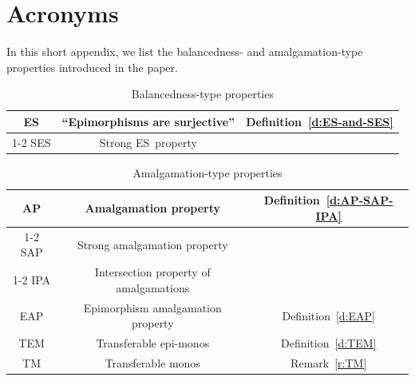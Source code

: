 \documentclass[a4paper,10pt,reqno]{amsart}
\theoremstyle{definition}
\theoremstyle{remark}
\newcommand{\ES}{\textnormal{ES}}
\newcommand{\SES}{\textnormal{SES}}
\newcommand{\AP}{\textnormal{AP}}
\newcommand{\IPA}{\textnormal{IPA}}
\newcommand{\TM}{\textnormal{TM}}
\newcommand{\SAP}{\textnormal{SAP}}
\newcommand{\EAP}{\textnormal{EAP}}
\newcommand{\TEM}{\textnormal{TEM}}
\begin{document}
\appendix
\section{Acronyms}\label{s:acronyms}

In this short appendix, we list the balancedness- and amalgamation-type properties introduced in the paper. 

\begin{table}[H]
\centering
\begin{tabular}{ |c|c|c| } 
 \hline
 \ES & ``Epimorphisms are surjective'' & \multirow{2}{*}{Definition~\ref{d:ES-and-SES}} \\ 
 \cline{1-2}
 \SES & Strong \ES~property &  \\ 
 \hline
\end{tabular}
\caption{Balancedness-type properties}
\end{table}

\begin{table}[H]
\centering
\begin{tabular}{ |c|c|c| } 
 \hline
 \AP & Amalgamation property & \multirow{3}{*}{Definition~\ref{d:AP-SAP-IPA}} \\ 
  \cline{1-2}
 \SAP & Strong amalgamation property &  \\ 
  \cline{1-2}
 \IPA & Intersection property of amalgamations &  \\ 
 \hline
 \EAP & Epimorphism amalgamation property & Definition~\ref{d:EAP} \\
 \hline
 \TEM & Transferable epi-monos & Definition~\ref{d:TEM} \\
 \hline
 \TM & Transferable monos & Remark~\ref{r:TM} \\
 \hline
\end{tabular}
\caption{Amalgamation-type properties}
\end{table}



\end{document}
